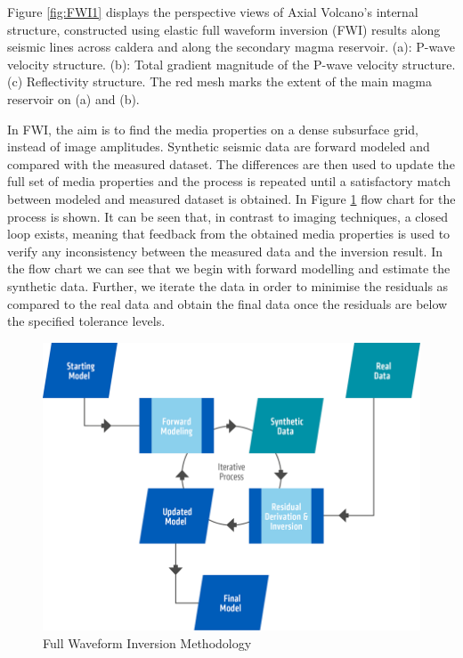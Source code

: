 \documentclass[10pt,a4paper]{article}
\begin{document}
Figure \ref{fig:FWI1} displays the perspective views of Axial Volcano’s internal structure, constructed using elastic full waveform inversion (FWI) results along seismic lines across caldera and along the secondary magma reservoir. (a): P-wave velocity structure. (b): Total gradient magnitude of the P-wave velocity structure. (c) Reflectivity structure. The red mesh marks the extent of the main magma reservoir on (a) and (b).

In FWI, the aim is to find the media properties on a dense subsurface grid, instead of image amplitudes. Synthetic seismic data are forward modeled and compared with the measured dataset. The differences are then used to update the full set of media properties and the process is repeated until a satisfactory match between modeled and measured dataset is obtained. In Figure \ref{fig:FWI2} flow chart for the process is shown. It can be seen that, in contrast to imaging techniques, a closed loop exists, meaning that feedback from the obtained media properties is used to verify any inconsistency between the measured data and the inversion result. In the flow chart we can see that we begin with forward modelling and estimate the synthetic data. Further, we iterate the data in order to minimise the residuals as compared to the real data and obtain the final data once the residuals are below the specified tolerance levels.


\begin{figure}
  \includegraphics[width=\linewidth]{FWI2.png}
  \caption{Full Waveform Inversion Methodology}
  \label{fig:FWI2}
\end{figure}
\end{document}
